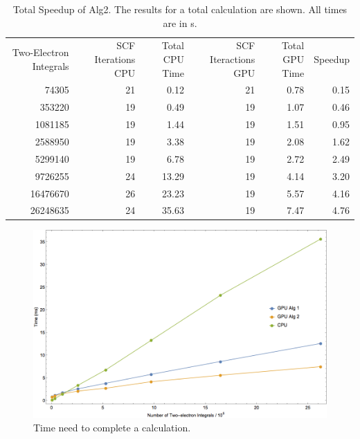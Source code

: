 \documentclass[12pt]{report}
\begin{document}
\begin{table}[h!]
\begin{center}
\caption[Total Speedup of Alg2]{Total Speedup of Alg2. The results for a total calculation are shown. All times are in s.}
\label{tab:totalprofalg2}
\begin{tabular}{rrrrrr}
\toprule
	\multirow{2}{3cm}{Two-Electron Integrals}	&	\multirow{2}{3cm}{SCF Iterations CPU}	&	\multirow{2}{2cm}{Total CPU Time}		&	\multirow{2}{3cm}{SCF Iteractions GPU}		&	\multirow{2}{2cm}{Total GPU Time}		&	\multirow{2}{*}{Speedup}	\\
	\\
\midrule
	74305	&	21	&	0.12		&	21	&	0.78	&	0.15	\\
	353220	&	19	&	0.49		&	19	&	1.07	&	0.46	\\
	1081185	&	19	&	1.44		&	19	&	1.51	&	0.95	\\
	2588950	&	19	&	3.38		&	19	&	2.08	&	1.62	\\
	5299140	&	19	&	6.78		&	19	&	2.72	&	2.49	\\
	9726255	&	24	&	13.29	&	19	&	4.14	&	3.20	\\
	16476670	&	26	&	23.23	&	19	&	5.57	&	4.16	\\
	26248635	&	24	&	35.63	&	19	&	7.47	&	4.76	\\
\bottomrule
\end{tabular}
\end{center}
\end{table}

\begin{figure}[h!]
\includegraphics[width=1\textwidth]{Figures/totaltimeprof.png}
\caption[Total Time need to complete a calculation.]
{Time need to complete a calculation.}
\label{fig:totaltimeprof}
\end{figure}
\end{document}

